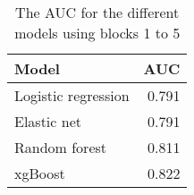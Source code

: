 \begin{table}
\centering
\caption{\label{tab:auc-all-models}The AUC for the different models using blocks 1 to 5}
\begin{tabular}[t]{lr}
\toprule
\textbf{Model} & \textbf{AUC}\\ 
\midrule
Logistic regression & 0.791 \\
Elastic net & 0.791\\
Random forest & 0.811\\
xgBoost & 0.822\\
\bottomrule
\end{tabular}
\end{table}